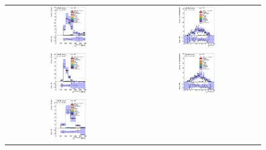 \clearpage
\begin{figure}[htbp]
\begin{center}
\begin{tabular}{cc}
%
\includegraphics[width=0.30\textwidth]{appendices/figures/sdrs/JetPt1_ELEMUONCR4_1W_NOMINAL.eps} &
\includegraphics[width=0.30\textwidth]{appendices/figures/sdrs/JetEta1_ELEMUONCR4_1W_NOMINAL.eps} \\
\includegraphics[width=0.30\textwidth]{appendices/figures/sdrs/JetPt2_ELEMUONCR4_1W_NOMINAL.eps} &
\includegraphics[width=0.30\textwidth]{appendices/figures/sdrs/JetEta2_ELEMUONCR4_1W_NOMINAL.eps} \\
\includegraphics[width=0.30\textwidth]{appendices/figures/sdrs/JetPt3_ELEMUONCR4_1W_NOMINAL.eps} &

\end{tabular}
\end{center}
\end{figure}
